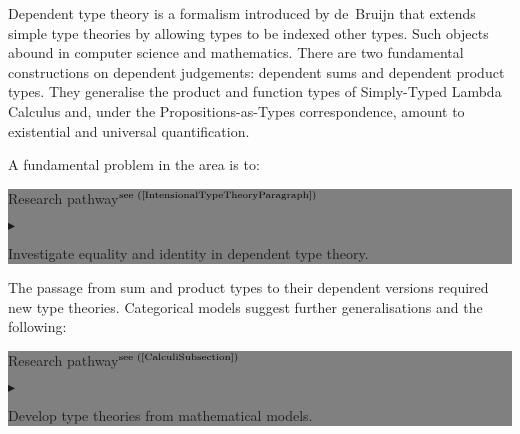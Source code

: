 \documentclass[11pt,twocolumn]{article}
\newenvironment{btritemize}
  {\begin{list}{\btr}
  {\setlength{\topsep}{2pt}
   \setlength{\partopsep}{2pt}
   \setlength{\itemsep}{2.5pt}
   \setlength{\parsep}{2.5pt}
   \setlength{\leftmargin}{1em}
   \setlength{\labelwidth}{.5em}}}
  {\end{list}}
\newcommand{\mysf}{\small\sf}
\newcommand{\mytextsf}[1]{\textsf{\small #1}}
\newcommand{\pref}[1]{\,(\ref{#1})}
\newcommand{\eg}{\emph{eg.}}
\newcommand{\btr}{$\blacktriangleright$}
\newcommand{\reqpsize}{8.113395cm}%
\newcommand{\rep}[2]{\begin{center}\colorbox{grey}{\begin{minipage}{\reqpsize}
  \mytextsf{Research pathway}\hfill$^{\mbox{\scriptsize see #1 }}$\\[-5.5mm]
  \begin{btritemize}
  \item #2
  \end{btritemize}
\end{minipage}}\end{center}}
\begin{document}
Dependent type theory is a formalism introduced by
de~Bruijn %
that extends simple type theories by allowing types to be indexed 
other types.  Such objects abound in computer science and mathematics.  
There are two fundamental constructions on %
dependent judgements: %
dependent sums and dependent product types.  %
They generalise the product and function types of Simply-Typed Lambda
Calculus and, under the Propositions-as-Types correspondence, amount to
existential and universal quantification.  

A fundamental problem in the area is to:
\rep{(\ref{IntensionalTypeTheoryParagraph})}
  {Investigate equality and identity in dependent type theory.}

The passage from sum and product types to their dependent versions
required new type theories.  Categorical models suggest further
generalisations 
and the following: %
\rep{(\ref{CalculiSubsection})}
  {Develop type theories from mathematical models.}
\end{document}
